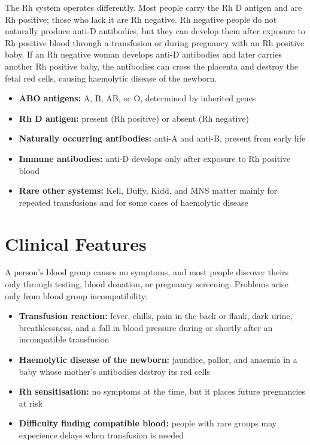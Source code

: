 The Rh system operates differently. Most people carry the Rh D antigen and are Rh positive; those who lack it are Rh negative. Rh negative people do not naturally produce anti-D antibodies, but they can develop them after exposure to Rh positive blood through a transfusion or during pregnancy with an Rh positive baby. If an Rh negative woman develops anti-D antibodies and later carries another Rh positive baby, the antibodies can cross the placenta and destroy the fetal red cells, causing haemolytic disease of the newborn.

\begin{itemize}
    \item \textbf{ABO antigens:} A, B, AB, or O, determined by inherited genes
    \item \textbf{Rh D antigen:} present (Rh positive) or absent (Rh negative)
    \item \textbf{Naturally occurring antibodies:} anti-A and anti-B, present from early life
    \item \textbf{Immune antibodies:} anti-D develops only after exposure to Rh positive blood
    \item \textbf{Rare other systems:} Kell, Duffy, Kidd, and MNS matter mainly for repeated transfusions and for some cases of haemolytic disease
\end{itemize}

\section*{Clinical Features}
A person's blood group causes no symptoms, and most people discover theirs only through testing, blood donation, or pregnancy screening. Problems arise only from blood group incompatibility:

\begin{itemize}
    \item \textbf{Transfusion reaction:} fever, chills, pain in the back or flank, dark urine, breathlessness, and a fall in blood pressure during or shortly after an incompatible transfusion
    \item \textbf{Haemolytic disease of the newborn:} jaundice, pallor, and anaemia in a baby whose mother's antibodies destroy its red cells
    \item \textbf{Rh sensitisation:} no symptoms at the time, but it places future pregnancies at risk
    \item \textbf{Difficulty finding compatible blood:} people with rare groups may experience delays when transfusion is needed
\end{itemize}


